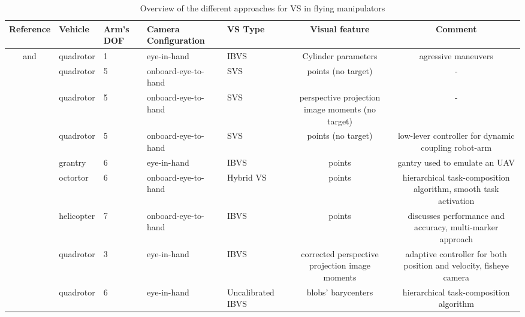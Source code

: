 \begin{table}
\setlength\extrarowheight{0.3pt} %
	\begin{tabularx}{\textwidth}{CPPBPCC}
		\toprule
		\textbf{Reference} & \textbf{Vehicle} & \textbf{Arm's DOF} & \textbf{Camera Configuration} & \textbf{VS Type} & \textbf{Visual feature} & \textbf{Comment} \\ 
		\midrule
		\cite{thomas_toward_2014} and \cite{thomas_visual_2016} & quadrotor  & 1 & eye-in-hand & IBVS & Cylinder parameters & agressive maneuvers \\ 
		\cite{mebarki_image-based_2014} & quadrotor  & 5 & onboard-eye-to-hand  & SVS & points (no target) & - \\ 
		\cite{mebarki_exploiting_2013}  & quadrotor  & 5 & onboard-eye-to-hand  & SVS & perspective projection image moments (no target) & - \\ 
		\cite{mebarki_cross-coupled_2014} & quadrotor  & 5 & onboard-eye-to-hand  & SVS & points (no target) & low-lever controller for dynamic coupling robot-arm \\ 
		\cite{danko_evaluation_2014} & grantry & 6 & eye-in-hand & IBVS & points & gantry used to emulate an UAV \\ 
		\cite{lippiello_hybrid_2016} & octortor & 6 & onboard-eye-to-hand  & Hybrid VS & points & hierarchical task-composition algorithm, smooth task activation \\
		\cite{laiacker_high_2016} & helicopter & 7 & onboard-eye-to-hand  & IBVS & points & discusses performance and accuracy, multi-marker approach \\ 
		\cite{kim_vision-guided_2016} & quadrotor  & 3 & eye-in-hand & IBVS  & corrected perspective projection image moments & adaptive controller for both position and velocity, fisheye camera \\ 
		\cite{santamaria-navarro_uncalibrated_2017} & quadrotor  & 6 & eye-in-hand & Uncalibrated IBVS & blobs' barycenters & hierarchical task-composition algorithm \\
		\bottomrule
	\end{tabularx}
	\caption{Overview of the different approaches for VS in flying manipulators}
	\label{vs-manipulators-table}
\end{table}
